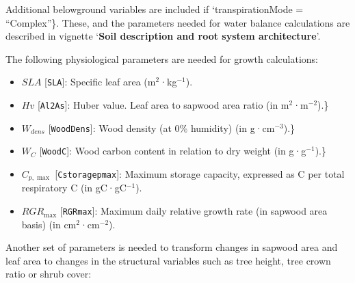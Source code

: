 \documentclass[]{book}
\providecommand{\tightlist}{%
  \setlength{\itemsep}{0pt}\setlength{\parskip}{0pt}}
\begin{document}
Additional belowground variables are included if `transpirationMode =
``Complex''\}. These, and the parameters needed for water balance
calculations are described in vignette
`\textbf{Soil description and root system architecture}'.

The following physiological parameters are needed for growth
calculations:

\begin{itemize}
\tightlist
\item
  \(SLA\) {[}\texttt{SLA}{]}: Specific leaf area (m\(^2\)·kg\(^{-1}\)).
\item
  \(Hv\) {[}\texttt{Al2As}{]}: Huber value. Leaf area to sapwood area
  ratio (in m\(^2\)·m\(^{-2}\)).\}
\item
  \(W_{dens}\) {[}\texttt{WoodDens}{]}: Wood density (at 0\% humidity)
  (in g·cm\(^{-3}\)).\}
\item
  \(W_{C}\) {[}\texttt{WoodC}{]}: Wood carbon content in relation to dry
  weight (in g·g\(^{-1}\)).\}
\item
  \(C_{p,\max}\) {[}\texttt{Cstoragepmax}{]}: Maximum storage capacity,
  expressed as C per total respiratory C (in gC·gC\(^{-1}\)).
\item
  \(RGR_{\max}\) {[}\texttt{RGRmax}{]}: Maximum daily relative growth
  rate (in sapwood area basis) (in cm\(^2\)·cm\(^{-2}\)).
\end{itemize}

Another set of parameters is needed to transform changes in sapwood area
and leaf area to changes in the structural variables such as tree
height, tree crown ratio or shrub cover:
\end{document}
